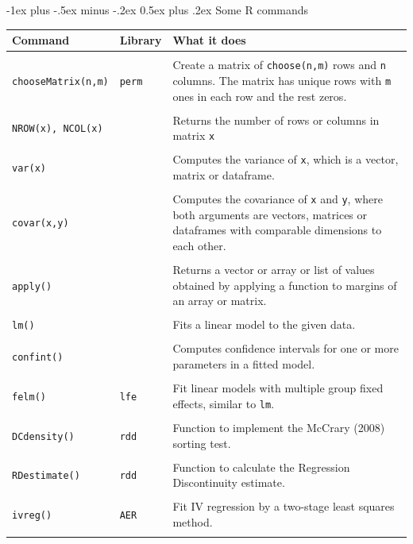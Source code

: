 \documentclass[a4paper,10pt,landscape]{article}
\makeatletter
\renewcommand{\section}{\@startsection{section}{1}{0mm}%
                                {-1ex plus -.5ex minus -.2ex}%
                                {0.5ex plus .2ex}%
                                {\normalfont\large\bfseries}}
\makeatother
\begin{document}
\begin{multicols*}{3}

\section{Some R commands}

\medskip

\begin{minipage}[h]{\columnwidth}
	\begin{tabular}{C{2.6cm}C{1.5cm}L{3.25cm}}
		\toprule[\heavyrulewidth]\toprule[\heavyrulewidth]
		\textbf{Command} & \textbf{Library} & \textbf{What it does} \\
		\midrule\\
		\texttt{chooseMatrix(n,m)} & \texttt{perm} & Create a matrix of \texttt{choose(n,m)} rows and \texttt{n} columns. The matrix has unique rows with \texttt{m} ones in each row and the rest zeros.\\
		&&\\
		\texttt{NROW(x), NCOL(x)} &   & Returns the number of rows or columns in matrix \texttt{x}\\
		&&\\
		\texttt{var(x)} & & Computes the variance of \texttt{x}, which is a vector, matrix or dataframe.\\
		&&\\
		\texttt{covar(x,y)} & & Computes the covariance of \texttt{x} and \texttt{y}, where both arguments are vectors, matrices or dataframes with comparable dimensions to each other.\\
		&&\\
		\texttt{apply()} & & Returns a vector or array or list of values obtained by applying a function to margins of an array or matrix.\\
		&&\\
		\texttt{lm()}& & Fits a linear model to the given data.\\
		&&\\
		\texttt{confint()} & & Computes confidence intervals for one or more parameters in a fitted model.\\
		&&\\
		\texttt{felm()} & \texttt{lfe} & Fit linear models with multiple group fixed effects, similar to \texttt{lm}.\\
		&&\\
		\texttt{DCdensity()} & \texttt{rdd} & Function to implement the McCrary (2008) sorting test.\\
		&&\\
		\texttt{RDestimate()} & \texttt{rdd} & Function to calculate the Regression Discontinuity estimate.\\
		&&\\
		\texttt{ivreg()} & \texttt{AER} & Fit IV regression by a two-stage least squares method.\\
		&&\\
		\bottomrule[\heavyrulewidth]\bottomrule[\heavyrulewidth]
	\end{tabular}
\end{minipage}
\medskip


\end{multicols*}
\end{document}
